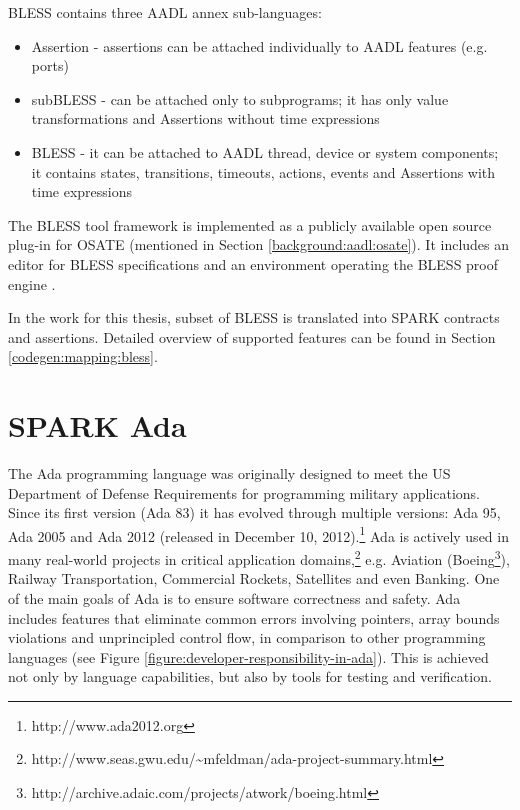 BLESS contains three AADL annex sub-languages:
\begin{itemize} \itemsep1pt \parskip0pt 
	\item Assertion - assertions can be attached individually to AADL features (e.g. ports)
	\item subBLESS - can be attached only to subprograms; it has only value transformations and Assertions without time expressions
	\item BLESS - it can be attached to AADL thread, device or system components; it contains states, transitions, timeouts, actions, events and Assertions with time expressions
\end{itemize}

The BLESS tool framework is implemented as a publicly available open source plug-in for OSATE (mentioned in Section \ref{background:aadl:osate}). It includes an editor for BLESS specifications and an environment operating the BLESS proof engine \cite{Bless:Paper}.

In the work for this thesis, subset of BLESS is translated into SPARK contracts and assertions. Detailed overview of supported features can be found in Section \ref{codegen:mapping:bless}.



\section{SPARK Ada}
\label{background:spark}


The Ada programming language was originally designed to meet the US Department of Defense Requirements for programming military applications. Since its first version (Ada 83) it has evolved through multiple versions: Ada 95, Ada 2005 and Ada 2012 (released in December 10, 2012).\footnote{http://www.ada2012.org} Ada is actively used in many real-world projects in critical application domains,\footnote{http://www.seas.gwu.edu/\textasciitilde{}mfeldman/ada-project-summary.html} e.g. Aviation (Boeing\footnote{http://archive.adaic.com/projects/atwork/boeing.html}), Railway Transportation, Commercial Rockets, Satellites and even Banking. One of the main goals of Ada is to ensure software correctness and safety. Ada includes features that eliminate common errors involving pointers, array bounds violations and unprincipled control flow, in comparison to other programming languages (see Figure \ref{figure:developer-responsibility-in-ada}). This is achieved not only by language capabilities, but also by tools for testing and verification. 

